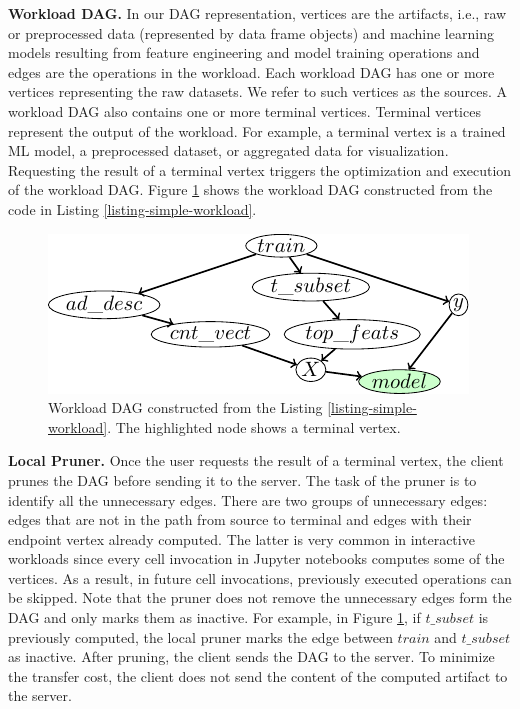 \textbf{Workload DAG.}
In our DAG representation, vertices are the artifacts, i.e., raw or preprocessed data (represented by data frame objects) and machine learning models resulting from feature engineering and model training operations and edges are the operations in the workload.
Each workload DAG has one or more vertices representing the raw datasets.
We refer to such vertices as the sources.
A workload DAG also contains one or more terminal vertices.
Terminal vertices represent the output of the workload.
For example, a terminal vertex is a trained ML model, a preprocessed dataset, or aggregated data for visualization.
Requesting the result of a terminal vertex triggers the optimization and execution of the workload DAG.
Figure \ref{fig-workload-dag} shows the workload DAG constructed from the code in Listing \ref{listing-simple-workload}.
\begin{figure}
\centering
\includegraphics[width=\linewidth]{../images/tikz-standalone/example-graph}
\caption{Workload DAG constructed from the Listing \ref{listing-simple-workload}. The highlighted node shows a terminal vertex.}
\label{fig-workload-dag}
\end{figure}

\textbf{Local Pruner.}
Once the user requests the result of a terminal vertex, the client prunes the DAG before sending it to the server.
The task of the pruner is to identify all the unnecessary edges.
There are two groups of unnecessary edges: edges that are not in the path from source to terminal and edges with their endpoint vertex already computed.
The latter is very common in interactive workloads since every cell invocation in Jupyter notebooks computes some of the vertices.
As a result, in future cell invocations, previously executed operations can be skipped.
Note that the pruner does not remove the unnecessary edges form the DAG and only marks them as inactive.
For example, in Figure \ref{fig-workload-dag}, if $t\_subset$ is previously computed, the local pruner marks the edge between $train$ and $t\_subset$ as inactive.
After pruning, the client sends the DAG to the server.
To minimize the transfer cost, the client does not send the content of the computed artifact to the server.

